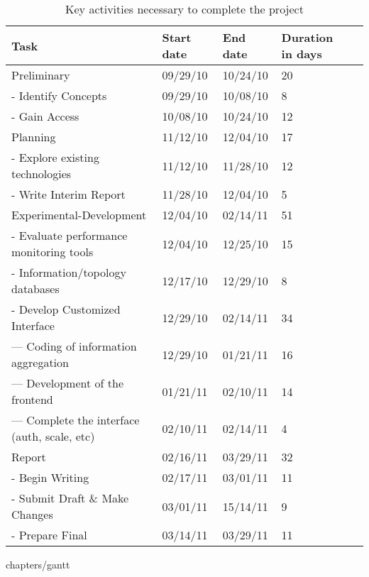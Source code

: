 \begin{table}[ht]
\begin{tabular}{ | l | l | l | l | r |}    
\hline
Task & Start date & End date & Duration in days \\ \hline
  Preliminary & 09/29/10 & 10/24/10 & 20 \\ \hline 
  -  Identify Concepts & 09/29/10 & 10/08/10 & 8 \\ \hline 
  -  Gain Access & 10/08/10 & 10/24/10 & 12 \\ \hline 
  Planning & 11/12/10 & 12/04/10 & 17 \\ \hline 
  -  Explore existing technologies & 11/12/10 & 11/28/10 & 12 \\ \hline 
  -  Write Interim Report & 11/28/10 & 12/04/10 & 5 \\ \hline 
  Experimental-Development & 12/04/10 & 02/14/11 & 51 \\ \hline 
  -  Evaluate performance monitoring tools & 12/04/10 & 12/25/10 & 15 \\ \hline 
  -  Information/topology databases & 12/17/10 & 12/29/10 & 8 \\ \hline 
  -  Develop Customized Interface & 12/29/10 & 02/14/11 & 34 \\ \hline 
  ---    Coding of information aggregation & 12/29/10 & 01/21/11 & 16 \\ \hline 
  ---    Development of the frontend & 01/21/11 & 02/10/11 & 14 \\ \hline 
  ---    Complete the interface (auth, scale, etc) & 02/10/11 & 02/14/11 & 4 \\
      \hline Report & 02/16/11 & 03/29/11 & 32 \\ \hline 
  -  Begin Writing & 02/17/11 & 03/01/11 & 11 \\ \hline 
  -  Submit Draft \& Make Changes & 03/01/11 & 15/14/11 & 9 \\ \hline 
  -  Prepare Final & 03/14/11 & 03/29/11 & 11 \\ \hline 
\end{tabular}
\caption{Key activities necessary to complete the project}
\label{tab:tasks}
\end{table}

 {chapters/gantt}
